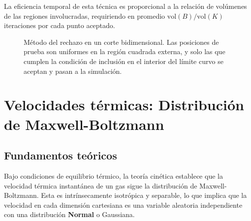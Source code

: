 \documentclass[11pt]{article}
\begin{document}
La eficiencia temporal de esta técnica es proporcional a la relación de volúmenes de las regiones involucradas, requiriendo en promedio $\mathrm{vol}(B)/\mathrm{vol}(K)$ iteraciones por cada punto aceptado.

\begin{figure}[H]
    \centering
    \caption{Método del rechazo en un corte bidimensional. Las posiciones de prueba son uniformes en la región cuadrada externa, y solo las que cumplen la condición de inclusión en el interior del límite curvo se aceptan y pasan a la simulación.}
\end{figure}


\section{Velocidades térmicas: Distribución de Maxwell-Boltzmann}

\subsection{Fundamentos teóricos}

Bajo condiciones de equilibrio térmico, la teoría cinética establece que la velocidad térmica instantánea de un gas sigue la distribución de Maxwell-Boltzmann. Esta es intrínsecamente isotrópica y separable, lo que implica que la velocidad en cada dimensión cartesiana es una variable aleatoria independiente con una distribución \textbf{Normal} o Gaussiana. 
\end{document}

